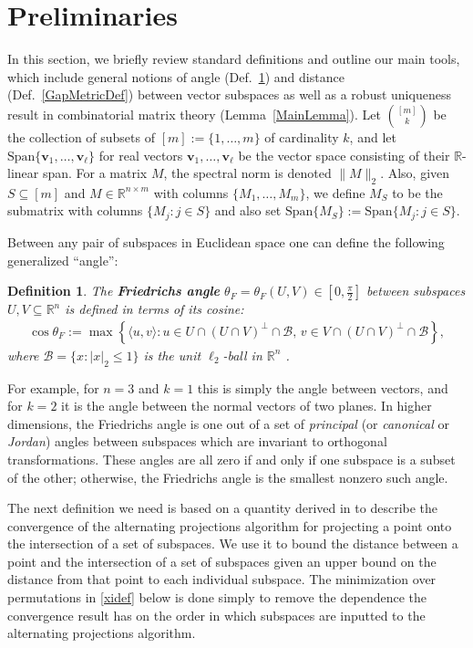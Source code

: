 \documentclass[journal, onecolumn]{IEEEtran}
\newtheorem{definition}{Definition}
\begin{document}
\section{Preliminaries}\label{Preliminaries}
In this section, we briefly review standard definitions and outline our main tools, which include general notions of angle (Def.~\ref{FriedrichsDefinition}) and distance (Def.~\ref{GapMetricDef}) between vector subspaces as well as a robust uniqueness result in combinatorial matrix theory (Lemma~\ref{MainLemma}).
Let ${[m] \choose k}$ be the collection of subsets of $[m] := \{1,\ldots,m\}$ of cardinality $k$, and let $\text{Span}\{\mathbf{v}_1, \ldots, \mathbf{v}_\ell\}$ for real vectors $\mathbf{v}_1, \ldots, \mathbf{v}_\ell$ be the vector space consisting of their $\mathbb{R}$-linear span.  For a matrix $M$, the spectral norm is denoted $\|M\|_2$.
Also, given $S \subseteq [m]$ and $M \in \mathbb{R}^{n \times m}$ with columns $\{M_1,\ldots,M_m\}$, we define $M_S$ to be the submatrix with columns $\{M_j: j \in S\}$ and also set $\text{Span}\{M_S\} := \text{Span}\{M_j : j \in S\}$.  

Between any pair of subspaces in Euclidean space one can define the following generalized ``angle'':
\begin{definition}\label{FriedrichsDefinition}
The \textbf{Friedrichs angle} $\theta_F = \theta_F(U,V) \in [0,\frac{\pi}{2}]$ between subspaces $U,V \subseteq \mathbb{R}^n$ is defined in terms of its cosine:
\begin{align}
\cos{\theta_F} := \max\left\{ \langle u, v \rangle: u \in U \cap (U \cap V)^\perp \cap \mathcal{B}, \, v \in V \cap (U \cap V)^\perp \cap \mathcal{B} \right\},
\end{align}
where $\mathcal{B} = \{ x: |x|_2 \leq 1\}$ is the unit $\ell_2$-ball in $\mathbb{R}^n$ \cite{Deutsch}.
\end{definition}
For example, for $n=3$ and $k=1$ this is simply the angle between vectors, and for $k=2$ it is the angle between the normal vectors of two planes. In higher dimensions, the Friedrichs angle is one out of a set of \textit{principal} (or \textit{canonical} or \textit{Jordan}) angles between subspaces which are invariant to orthogonal transformations. These angles are all zero if and only if one subspace is a subset of the other; otherwise, the Friedrichs angle is the smallest nonzero such angle. 

The next definition we need is based on a quantity derived in \cite{Deutsch} to describe the convergence of the alternating projections algorithm for projecting a point onto the intersection of a set of subspaces. We use it to bound the distance between a point and the intersection of a set of subspaces given an upper bound on the distance from that point to each individual subspace. The minimization over permutations in \eqref{xidef} below is done simply to remove the dependence the convergence result has on the order in which subspaces are inputted to the alternating projections algorithm.
\end{document}
